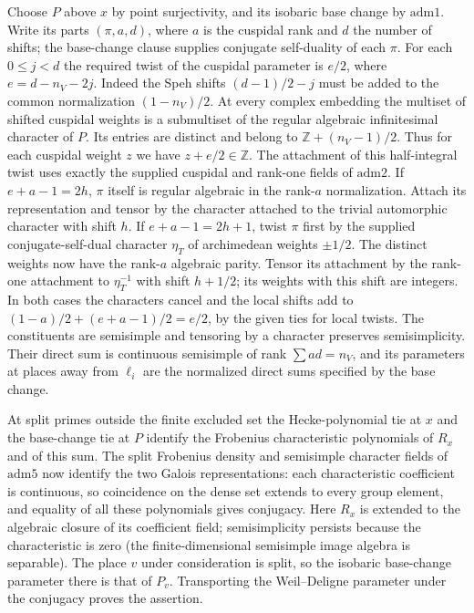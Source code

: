 Choose $P$ above $x$ by point surjectivity, and its isobaric base
change by $\mathrm{adm1}$. Write its parts $(\pi,a,d)$, where $a$
is the cuspidal rank and $d$ the number of shifts; the base-change
clause supplies conjugate self-duality of each $\pi$. For each
$0\le j<d$ the required twist of the cuspidal parameter is $e/2$,
where $e=d-n_V-2j$. Indeed the Speh shifts $(d-1)/2-j$ must be
added to the common normalization $(1-n_V)/2$. At every complex
embedding the multiset of shifted cuspidal weights is a submultiset
of the regular algebraic infinitesimal character of $P$. Its
entries are distinct and belong to $\mathbb Z+(n_V-1)/2$.
Thus for each cuspidal weight $z$ we have $z+e/2\in\mathbb Z$.
The attachment of this half-integral twist uses exactly the supplied
cuspidal and rank-one fields of $\mathrm{adm2}$. If $e+a-1=2h$,
$\pi$ itself is regular algebraic in the rank-$a$ normalization.
Attach its representation and tensor by the character attached to
the trivial automorphic character with shift $h$. If
$e+a-1=2h+1$, twist $\pi$ first by the supplied conjugate-self-dual
character $\eta_T$ of archimedean weights $\pm1/2$.
The distinct weights now have the rank-$a$ algebraic parity.
Tensor its attachment by the rank-one attachment to
$\eta_T^{-1}$ with shift $h+1/2$; its weights with this shift are
integers. In both cases the characters cancel and the local shifts add
to $(1-a)/2+(e+a-1)/2=e/2$, by the given ties for local twists.
The constituents are semisimple and tensoring by a character preserves
semisimplicity. Their direct sum is continuous semisimple of rank
$\sum ad=n_V$, and its parameters at places away from $\ell_i$ are
the normalized direct sums specified by the base change.

At split primes outside the finite excluded set the Hecke-polynomial
tie at $x$ and the base-change tie at $P$ identify the Frobenius
characteristic polynomials of $R_x$ and of this sum. The split
Frobenius density and semisimple character fields of $\mathrm{adm5}$
now identify the two Galois representations: each characteristic
coefficient is continuous, so coincidence on the dense set extends
to every group element, and equality of all these polynomials gives
conjugacy. Here $R_x$ is extended to the algebraic closure of its
coefficient field; semisimplicity persists because the characteristic
is zero (the finite-dimensional semisimple image algebra is separable).
The place $v$ under consideration is split, so the isobaric
base-change parameter there is that of $P_v$. Transporting
the Weil--Deligne parameter under the conjugacy proves the assertion.

